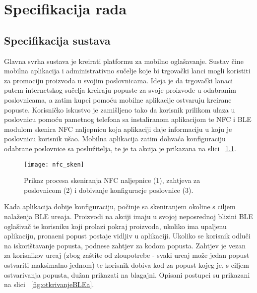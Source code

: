 \chapter{Specifikacija rada}


\section{Specifikacija sustava}

Glavna svrha sustava je kreirati platformu za mobilno ogla\v{s}avanje. Sustav \v{c}ine mobilna aplikacija i administrativno su\v{c}elje koje bi trgova\v{c}ki lanci mogli koristiti za promociju proizvoda u svojim poslovnicama. Ideja je da trgova\v{c}ki lanaci putem internetskog su\v{c}elja kreiraju popuste za svoje proizvode u odabranim poslovnicama, a zatim kupci pomo\'{c}u mobilne aplikacije ostvaruju kreirane popuste. Korisni\v{c}ko iskustvo je zami\v{s}ljeno tako da korisnik prilikom ulaza u poslovnicu pomo\'{c}u pametnog telefona sa instaliranom aplikacijom te NFC i BLE modulom skenira NFC naljepnicu koja aplikaciji daje informaciju u koju je poslovnicu korisnik u\v{s}ao. Mobilna aplikacija zatim dohva\'{c}a konfiguraciju odabrane poslovnice sa poslu\v{z}itelja, te je ta akcija je prikazana na slici ~\ref{fig:skeniranjeNaljepnice}.

\begin{figure}[!htbp]
	\begin{center}
 \texttt{[image: nfc\_sken]}
 \caption{Prikaz procesa skeniranja NFC naljepnice (1), zahtjeva za poslovnicom (2) i dobivanje konfiguracje poslovnice (3).}
 \label{fig:skeniranjeNaljepnice}
	\end{center}
\end{figure}

Kada aplikacija dobije konfiguraciju, po\v{c}inje sa skeniranjem okoline s ciljem nala\v{z}enja BLE ure\dj aja. Proizvodi na akciji imaju u svojoj neposrednoj blizini BLE ogla\v{s}iva\v{c} te korisniku koji prolazi pokraj proizvoda, ukoliko ima upaljenu aplikaciju, prona\dj eni popust postaje vidljiv u aplikaciji. Ukoliko se korisnik odlu\v{c}i na iskori\v{s}tavanje popusta, podnese zahtjev za kodom popusta. Zahtjev je vezan za korisnikov ure\dj aj (zbog za\v{s}tite od zloupotrebe - svaki ure\dj aj mo\v{z}e jedan popust ostvariti maksimalno jednom) te korisnik dobiva kod za popust kojeg je, s ciljem ostvarivanja popusta, du\v{z}an prikazati na blagajni. Opisani postupci su prikazani na slici  ~\ref{fig:otkrivanjeBLEa}.

